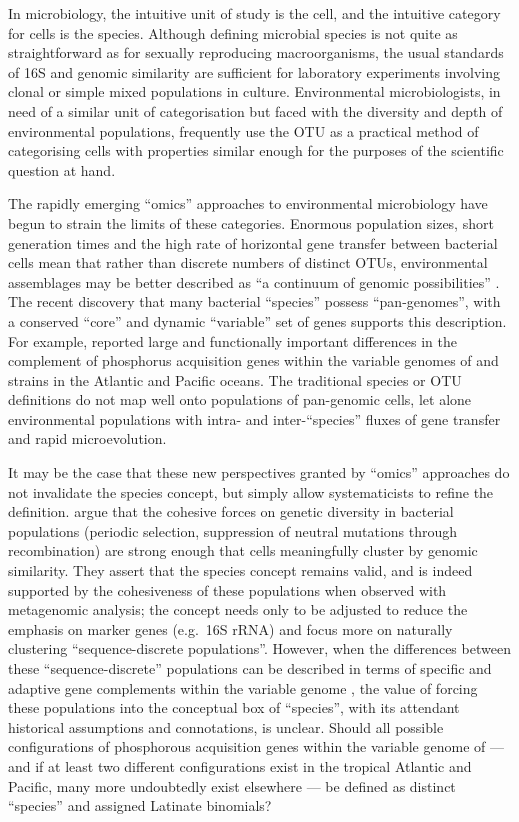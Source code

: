 In microbiology, the intuitive unit of study is the cell, and the intuitive category for cells is the species.
Although defining microbial species is not quite as straightforward as for sexually reproducing macroorganisms, the usual standards of 16S and genomic similarity are sufficient for laboratory experiments involving clonal or simple mixed populations in culture.
Environmental microbiologists, in need of a similar unit of categorisation but faced with the diversity and depth of environmental populations, frequently use the \ac{OTU} as a practical method of categorising cells with properties similar enough for the purposes of the scientific question at hand.

The rapidly emerging ``omics'' approaches to environmental microbiology have begun to strain the limits of these categories.
Enormous population sizes, short generation times and the high rate of horizontal gene transfer between bacterial cells mean that rather than discrete numbers of distinct \acp{OTU}, environmental assemblages may be better described as ``a continuum of genomic possibilities'' \cite{Goldenfeld:2007im}.
The recent discovery that many bacterial ``species'' possess ``pan-genomes'', with a conserved ``core'' and dynamic ``variable'' set of genes \cite{Tettelin:2005jg} supports this description.
For example, \citet{Coleman:2010jj} reported large and functionally important differences in the complement of phosphorus acquisition genes within the variable genomes of  and  strains in the Atlantic and Pacific oceans.
The traditional species or \ac{OTU} definitions do not map well onto populations of pan-genomic cells, let alone environmental populations with intra- and inter-``species'' fluxes of gene transfer and rapid microevolution.

It may be the case that these new perspectives granted by ``omics'' approaches do not invalidate the species concept, but simply allow systematicists to refine the definition.
\citet{CaroQuintero:2011jv} argue that the cohesive forces on genetic diversity in bacterial populations (periodic selection, suppression of neutral mutations through recombination) are strong enough that cells meaningfully cluster by genomic similarity.
They assert that the species concept remains valid, and is indeed supported by the cohesiveness of these populations when observed with metagenomic analysis; the concept needs only to be adjusted to reduce the emphasis on marker genes (e.g.\ 16S rRNA) and focus more on naturally clustering ``sequence-discrete populations''.
However, when the differences between these ``sequence-discrete'' populations can be described in terms of specific and adaptive gene complements within the variable genome \citep[as in][]{Coleman:2010jj}, the value of forcing these populations into the conceptual box of ``species'', with its attendant historical assumptions and connotations, is unclear.
Should all possible configurations of phosphorous acquisition genes within the variable genome of  --- and if at least two different configurations exist in the tropical Atlantic and Pacific, many more undoubtedly exist elsewhere --- be defined as distinct ``species'' and assigned Latinate binomials?


